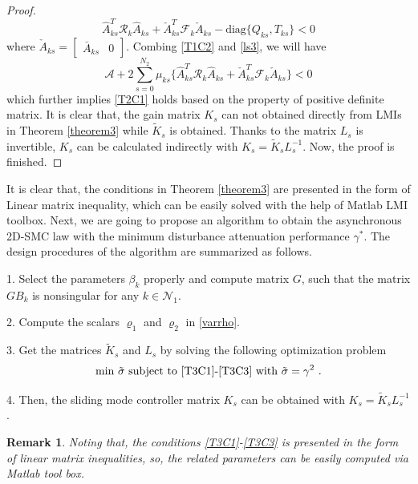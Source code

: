 \documentclass[conference]{IEEEtran}
\newtheorem{remark}{Remark}
\begin{document}
\begin{proof}
	 \begin{equation} \label{ls3}
	 	\hat{A}^{T}_{ks}\mathcal{R}_{k}\hat{A}_{ks} + \check{A}^{T}_{ks}\mathcal{F}_{k}\check{A}_{ks}  - \mathrm{diag}\{Q_{ks}, T_{ks}\} < 0  
	 \end{equation}
	 where $\check{A}_{ks}=\begin{bmatrix}
	 \bar{A}_{ks}&0
	 \end{bmatrix}$. Combing \eqref{T1C2} and \eqref{ls3},  we will have
	 \begin{equation}
	 	\mathcal{A} +2\sum_{s=0}^{N_{2}}\mu_{ks}\Big\{ \hat{A}^{T}_{ks}\mathcal{R}_{k}\hat{A}_{ks} + \check{A}^{T}_{ks}\mathcal{F}_{k}\check{A}_{ks} \Big\} < 0
	 \end{equation}
	 which further implies \eqref{T2C1} holds based on the property of positive definite matrix. It is clear that, the gain matrix $K_{s}$ can not obtained directly from LMIs in Theorem \ref{theorem3} while $\tilde{K}_{s}$ is obtained. Thanks to the matrix $L_{s}$ is invertible, $K_{s}$ can be calculated indirectly with $K_{s}=\tilde{K}_{s}L^{-1}_{s}$. Now, the proof is finished.
\end{proof}


	It is clear that, the conditions in Theorem \ref{theorem3} are presented in the form of Linear matrix inequality, which can be easily solved with the help of Matlab LMI toolbox. Next, we are going to propose an algorithm to obtain the asynchronous 2D-SMC law with the minimum disturbance attenuation performance $\gamma^{*}$. The design procedures of the algorithm are summarized as follows.
	
	1. Select the parameters $\beta_{k}$ properly and compute matrix $G$, such that the matrix $GB_{k}$ is nonsingular for any $k\in\mathcal{N}_{1}$. 
	
	2. Compute the scalars $\varrho_{1}$ and $\varrho_{2}$ in \eqref{varrho}. 

	3. Get the matrices  $\tilde{K}_{s}$ and $L_{s}$ by solving the  following optimization problem
	\begin{equation}\label{optimization-problem}
		\text{min $\tilde{\sigma}$ subject to \eqref{T3C1}-\eqref{T3C3} with $\tilde\sigma=\gamma^{2}$ }.
	\end{equation}
	
	4. Then, the sliding mode controller matrix $K_s$ can be obtained with $K_{s}= \tilde{K}_{s}L^{-1}_{s}$.

\begin{remark}
	Noting that, the conditions \eqref{T3C1}-\eqref{T3C3} is presented in the form of linear matrix inequalities, so, the related parameters can be easily computed  via Matlab tool box. 
\end{remark}
\end{document}
